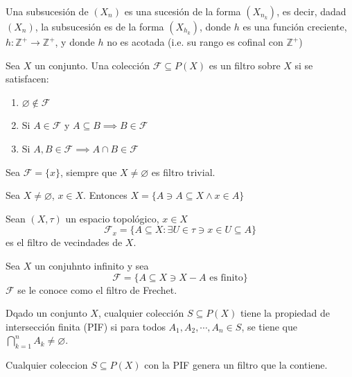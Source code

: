 \begin{definicion}[Subsucesión]
    Una subsucesión de $(X_n)$ es una sucesión de la forma $(X_{n_k})$, es decir, dadad $(X_n)$, la subsucesión es de la forma $(X_{h_k})$, donde $h$ es una función creciente, $h:\mathbb{Z}^+\to \mathbb{Z}^+$, y donde $h$ no es acotada (i.e. su rango es cofinal con $\mathbb{Z}^+$)
\end{definicion}
\begin{definicion}
    Sea $X$ un conjunto. Una colección $\mathcal{F}\subseteq P(X)$ es un filtro sobre $X$ si se satisfacen: 
    \begin{enumerate}
        \item $\varnothing\not\in \mathcal{F}$
        \item Si $A\in \mathcal{F}$ y $A\subseteq B\implies B\in \mathcal{F}$ 
        \item Si $A,B\in \mathcal{F}\implies A\cap B\in \mathcal{F}$
    \end{enumerate}
\end{definicion}

\begin{ejemplo}
    Sea $\mathcal{F}=\{x\}$, siempre que $X\neq \varnothing$ es filtro trivial. 
\end{ejemplo}

\begin{ejemplo}
    Sea $X\neq \varnothing$, $x\in X$. Entonces $X= \{A\ni A\subseteq X\wedge x\in A\}$
\end{ejemplo}
\begin{ejemplo}
    Sean $(X,\tau)$ un espacio topológico, $x\in X$ 
    $$\mathcal{F}_x=\{A\subseteq X: \exists U\in \tau \ni x\in U\subseteq A\}$$
    es el filtro de vecindades de $X$. 
\end{ejemplo}

\begin{ejemplo}
    Sea $X$ un conjuhnto infinito y sea 
    $$\mathcal{F}=\{A\subseteq X\ni X-A \text{ es finito}\}$$
    $\mathcal{F}$ se le conoce como el filtro de Frechet. 
\end{ejemplo}

\begin{cajita}
    Dqado un conjunto $X$, cualquier colección $S\subseteq P(X)$ tiene la propiedad de intersección finita (PIF) si para todos  $A_1,A_2,\cdots, A_n\in S$, se tiene que $\bigcap_{k=1}^n A_k\neq \varnothing$. 

\end{cajita}
\begin{nota}
    Cualquier coleccion $S\subseteq P(X)$ con la PIF genera un filtro que la contiene. 
\end{nota}

